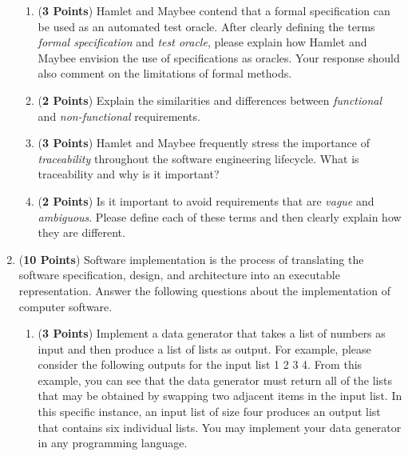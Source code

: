 \documentclass[12pt,epsf,psfig,graphics]{article}
\begin{document}
\begin{enumerate}
\begin{enumerate}

\item ({\bf 3 Points}) Hamlet and Maybee contend that a formal
  specification can be used as an automated test oracle.  After
  clearly defining the terms {\em formal specification} and {\em test
    oracle}, please explain how Hamlet and Maybee envision the use of
  specifications as oracles.  Your response should also comment on the
  limitations of formal methods.

\item ({\bf 2 Points}) Explain the similarities and differences
  between {\em functional} and {\em non-functional} requirements.

\item ({\bf 3 Points}) Hamlet and Maybee frequently stress the
  importance of {\em traceability} throughout the software engineering
  lifecycle.  What is traceability and why is it important?

\item ({\bf 2 Points}) Is it important to avoid requirements that are
  {\em vague} and {\em ambiguous}.  Please define each of these terms
  and then clearly explain how they are different.

\end{enumerate}

\newpage

\item ({\bf 10 Points}) Software implementation is the process of
  translating the software specification, design, and architecture
  into an executable representation.  Answer the following questions
  about the implementation of computer software.

\begin{enumerate}

  \item ({\bf 3 Points}) Implement a data generator that takes a list
    of numbers as input and then produce a list of lists as output.
    For example, please consider the following outputs for the input
    list 1 2 3 4.  From this example, you can see that the data
    generator must return all of the lists that may be obtained by
    swapping two adjacent items in the input list.  In this specific
    instance, an input list of size four produces an output list that
    contains six individual lists.  You may implement your data
    generator in any programming language.

    \begin{enumerate}


\end{enumerate}
\end{enumerate}
\end{enumerate}
\end{document}

